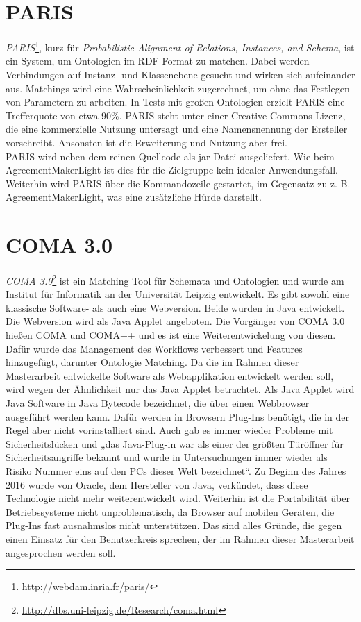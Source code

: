 		\section{PARIS}
		\textit{PARIS}\footnote{\url{http://webdam.inria.fr/paris/}}, kurz für
		\textit{Probabilistic Alignment of Relations, Instances, and Schema}, ist ein
		System, um Ontologien im RDF Format zu matchen. Dabei werden Verbindungen auf
		Instanz- und Klassenebene gesucht und wirken sich aufeinander aus. Matchings
		wird eine Wahrscheinlichkeit zugerechnet, um ohne das Festlegen von Parametern
		zu arbeiten. In Tests mit großen Ontologien erzielt PARIS eine Trefferquote
		von etwa 90\%. PARIS steht unter einer Creative Commons Lizenz, die eine
		kommerzielle Nutzung untersagt und eine Namensnennung der Ersteller
		vorschreibt. Ansonsten ist die Erweiterung und Nutzung aber frei.\\
		PARIS wird neben dem reinen Quellcode als jar-Datei ausgeliefert. Wie beim
		AgreementMakerLight ist dies für die Zielgruppe kein idealer Anwendungsfall.
		Weiterhin wird PARIS über die Kommandozeile gestartet, im Gegensatz zu z. B.
		AgreementMakerLight, was eine zusätzliche Hürde darstellt.
		
		\section{COMA 3.0}
		\textit{COMA 3.0}\footnote{\url{http://dbs.uni-leipzig.de/Research/coma.html}}
		ist ein Matching Tool für Schemata und Ontologien und wurde am Institut für
		Informatik an der Universität Leipzig entwickelt. Es gibt sowohl eine
		klassische Software- als auch eine Webversion. Beide wurden in Java
		entwickelt. Die Webversion wird als Java Applet angeboten. Die Vorgänger von
		COMA 3.0 hießen COMA und COMA++ und es ist eine Weiterentwickelung von diesen.
		Dafür wurde das Management des Workflows verbessert und Features hinzugefügt,
		darunter Ontologie Matching. Da die im Rahmen dieser Masterarbeit entwickelte
		Software als Webapplikation entwickelt werden soll, wird wegen der Ähnlichkeit
		nur das Java Applet betrachtet. Als Java Applet wird Java Software in Java
		Bytecode bezeichnet, die über einen Webbrowser ausgeführt werden kann. Dafür
		werden in Browsern Plug-Ins benötigt, die in der Regel aber nicht
		vorinstalliert sind. Auch gab es immer wieder Probleme mit Sicherheitslücken
		und „das Java-Plug-in war als einer der größten Türöffner für
		Sicherheitsangriffe bekannt und wurde in Untersuchungen immer wieder als
		Risiko Nummer eins auf den PCs dieser Welt bezeichnet“\cite{Heise16}. Zu
		Beginn des Jahres 2016 wurde von Oracle, dem Hersteller von Java, verkündet, dass diese
		Technologie nicht mehr weiterentwickelt wird.  Weiterhin ist die Portabilität
		über Betriebssysteme nicht unproblematisch, da Browser auf mobilen Geräten,
		die Plug-Ins fast ausnahmslos nicht unterstützen.  Das sind alles Gründe, die
		gegen einen Einsatz für den Benutzerkreis sprechen, der im Rahmen dieser
		Masterarbeit angesprochen werden soll.
		

